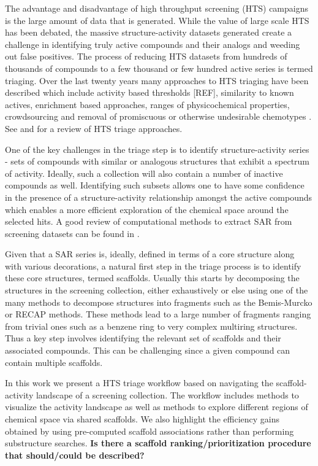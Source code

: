 \documentclass[journal=jacsat,manuscript=article]{achemso}
\begin{document}
The advantage and disadvantage of high throughput screening (HTS) campaigns is
the large amount of data that is generated. While the value of large scale HTS
has been debated\cite{Macarron:2011qv}, the massive structure-activity
datasets generated create a challenge in identifying truly active compounds and
their analogs and weeding out false positives. The process of reducing HTS
datasets from hundreds of thousands of compounds to a few thousand or few
hundred active series is termed triaging. Over the last twenty years many
approaches to HTS triaging have been described which include activity based
thresholds [REF], similarity to known actives, enrichment based
approaches\cite{Varin2010CSE,Pu:2012wf}, ranges of physicochemical
properties\cite{Cox:2012qy}, crowdsourcing\cite{Peng:2013qp} and removal of
promiscuous or otherwise undesirable chemotypes \cite{Dahlin:2014fp}. See
\citeauthor{Shun:2011sy} and \citeauthor{Langer:2009mw} for a review of HTS
triage approaches.

One of the key challenges in the triage step is to identify structure-activity
series - sets of compounds with similar or analogous structures that exhibit a
spectrum of activity. Ideally, such a collection will also contain a number of
inactive compounds as well. Identifying such subsets allows one to have some
confidence in the presence of a structure-activity relationship amongst the
active compounds which enables a more efficient exploration of the chemical
space around the selected hits. A good review of computational methods to extract SAR from screening datasets can be found in \citeauthor{Wawer2010review}. 

Given that a SAR series is, ideally, defined in terms of a core structure along
with various decorations, a natural first step in the triage process is to
identify these core structures, termed scaffolds. Usually this starts by
decomposing the structures in the screening collection, either exhaustively or
else using one of the many methods to decompose structures into fragments such
as the Bemis-Murcko\cite{BemisMurcko1999,BemisMurcko1996} or RECAP
methods\cite{Lewell:1998aa}. These methods lead to a large number of
fragments ranging from trivial ones such as a benzene ring to very complex
multiring structures. Thus a key step involves identifying the relevant set of
scaffolds and their associated compounds. This can be challenging since a given
compound can contain multiple scaffolds.

In this work we present a HTS triage workflow based on navigating the
scaffold-activity landscape of a screening collection. The workflow includes
methods to visualize the activity landscape as well as methods to explore
different regions of chemical space via shared scaffolds. We also highlight the
efficiency gains obtained by using pre-computed scaffold associations rather
than performing substructure searches. \textbf{Is there a scaffold
  ranking/prioritization procedure that should/could be described?}
\end{document}
